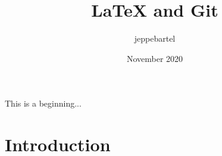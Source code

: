 \documentclass{article}
\title{LaTeX and Git}
\author{jeppebartel}
\date{November 2020}
\begin{document}
This is a beginning...

\maketitle

\section{Introduction}
\end{document}
